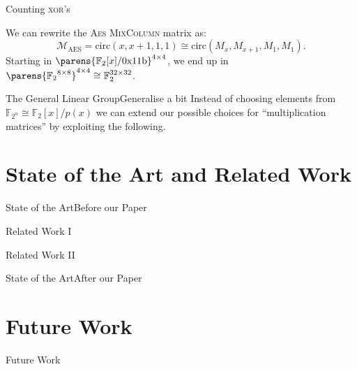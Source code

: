 \begin{frame}{Counting \textsc{xor}'s}
    \begin{example}
        We can rewrite the \textsc{Aes MixColumn} matrix as:
        \begin{equation*}
            \mathcal{M}_{\mathrm{AES}} = \mathrm{circ}(x, x+1, 1, 1) \cong \mathrm{circ}(M_x, M_{x+1}, M_1, M_1).
        \end{equation*}
        Starting in $\parens{\mathbb{F}_2[x]/\mathrm{0x11b}}^{4 \times 4}$, we end up in $\parens{{\mathbb{F}_2}^{8 \times 8}}^{4 \times 4} \cong {\mathbb{F}_2^{32 \times 32}}$.
    \end{example}
\end{frame}

\begin{frame}{The General Linear Group}{Generalise a bit}
    Instead of choosing elements from $\mathbb{F}_{2^n} \cong \mathbb{F}_2[x]/p(x)$ we can extend our possible choices for \enquote{multiplication matrices} by exploiting the following.
\end{frame}

\section{State of the Art and Related Work}
\begin{frame}{State of the Art}{Before our Paper}
\end{frame}

\begin{frame}{Related Work I}{}
\end{frame}

\begin{frame}{Related Work II}{}
\end{frame}

\begin{frame}{State of the Art}{After our Paper}
\end{frame}

\section{Future Work}
\begin{frame}{Future Work}{}
\end{frame}
